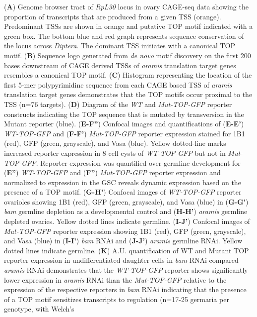 \documentclass[12pt,oneside]{reedthesis}
\begin{document}
(\textbf{A}) Genome browser tract of \emph{RpL30} locus in ovary
CAGE-seq data showing the proportion of transcripts that are produced
from a given TSS (orange). Predominant TSSs are shown in orange and
putative TOP motif indicated with a green box. The bottom blue and red
graph represents sequence conservation of the locus across \emph{Diptera}.
The dominant TSS initiates with a canonical TOP motif. (\textbf{B}) Sequence
logo generated from \emph{de novo} motif discovery on the first 200 bases
downstream of CAGE derived TSSs of \emph{aramis} translation target genes
resembles a canonical TOP motif. (\textbf{C}) Histogram representing the
location of the first 5-mer polypyrimidine sequence from each CAGE based
TSS of \emph{aramis} translation target genes demonstrates that the TOP
motifs occur proximal to the TSS (n=76 targets). (\textbf{D}) Diagram of the
\emph{WT} and \emph{Mut-TOP-GFP} reporter constructs indicating the TOP sequence
that is mutated by transversion in the Mutant reporter (blue).
(\textbf{E-F''}) Confocal images and quantifications of (\textbf{E-E'})
\emph{WT-TOP-GFP} and (\textbf{F-F'}) \emph{Mut-TOP-GFP} reporter expression stained
for 1B1 (red), GFP (green, grayscale), and Vasa (blue). Yellow
dotted-line marks increased reporter expression in 8-cell cysts of
\emph{WT-TOP-GFP} but not in \emph{Mut-TOP-GFP}. Reporter expression was
quantified over germline development for (\textbf{E''}) \emph{WT-TOP-GFP} and
(\textbf{F''}) \emph{Mut-TOP-GFP} reporter expression and normalized to expression
in the GSC reveals dynamic expression based on the presence of a TOP
motif. (\textbf{G-H'}) Confocal images of \emph{WT-TOP-GFP} reporter ovarioles
showing 1B1 (red), GFP (green, grayscale), and Vasa (blue) in (\textbf{G-G'})
\emph{bam} germline depletion as a developmental control and (\textbf{H-H'})
\emph{aramis} germline depleted ovaries. Yellow dotted lines indicate
germline. (\textbf{I-J'}) Confocal images of \emph{Mut-TOP-GFP} reporter
expression showing 1B1 (red), GFP (green, grayscale), and Vasa (blue) in
(\textbf{I-I'}) \emph{bam} RNAi and (\textbf{J-J'}) \emph{aramis} germline RNAi. Yellow
dotted lines indicate germline. (\textbf{K}) A.U. quantification of WT and
Mutant TOP reporter expression in undifferentiated daughter cells in
\emph{bam} RNAi compared \emph{aramis} RNAi demonstrates that the \emph{WT-TOP-GFP}
reporter shows significantly lower expression in \emph{aramis} RNAi than the
\emph{Mut-TOP-GFP} relative to the expression of the respective reporters in
\emph{bam} RNAi indicating that the presence of a TOP motif sensitizes
transcripts to regulation (n=17-25 germaria per genotype, with Welch's
\end{document}
